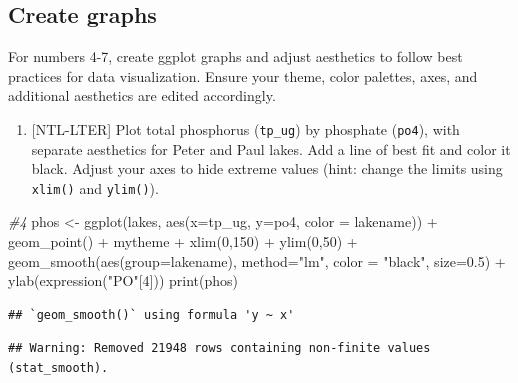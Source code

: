 \documentclass[
]{article}
\newenvironment{Shaded}{\begin{snugshade}}{\end{snugshade}}
\newcommand{\AttributeTok}[1]{\textcolor[rgb]{0.77,0.63,0.00}{#1}}
\newcommand{\CommentTok}[1]{\textcolor[rgb]{0.56,0.35,0.01}{\textit{#1}}}
\newcommand{\DecValTok}[1]{\textcolor[rgb]{0.00,0.00,0.81}{#1}}
\newcommand{\FloatTok}[1]{\textcolor[rgb]{0.00,0.00,0.81}{#1}}
\newcommand{\FunctionTok}[1]{\textcolor[rgb]{0.00,0.00,0.00}{#1}}
\newcommand{\NormalTok}[1]{#1}
\newcommand{\OtherTok}[1]{\textcolor[rgb]{0.56,0.35,0.01}{#1}}
\newcommand{\SpecialCharTok}[1]{\textcolor[rgb]{0.00,0.00,0.00}{#1}}
\newcommand{\StringTok}[1]{\textcolor[rgb]{0.31,0.60,0.02}{#1}}
\providecommand{\tightlist}{%
  \setlength{\itemsep}{0pt}\setlength{\parskip}{0pt}}
\begin{document}
\hypertarget{create-graphs}{%
\subsection{Create graphs}\label{create-graphs}}

For numbers 4-7, create ggplot graphs and adjust aesthetics to follow
best practices for data visualization. Ensure your theme, color
palettes, axes, and additional aesthetics are edited accordingly.

\begin{enumerate}
\def\labelenumi{\arabic{enumi}.}
\setcounter{enumi}{3}
\tightlist
\item
  {[}NTL-LTER{]} Plot total phosphorus (\texttt{tp\_ug}) by phosphate
  (\texttt{po4}), with separate aesthetics for Peter and Paul lakes. Add
  a line of best fit and color it black. Adjust your axes to hide
  extreme values (hint: change the limits using \texttt{xlim()} and
  \texttt{ylim()}).
\end{enumerate}

\begin{Shaded}
\begin{Highlighting}[]
\CommentTok{\#4}
\NormalTok{phos }\OtherTok{\textless{}{-}} \FunctionTok{ggplot}\NormalTok{(lakes, }\FunctionTok{aes}\NormalTok{(}\AttributeTok{x=}\NormalTok{tp\_ug, }\AttributeTok{y=}\NormalTok{po4, }\AttributeTok{color =}\NormalTok{ lakename)) }\SpecialCharTok{+} 
  \FunctionTok{geom\_point}\NormalTok{() }\SpecialCharTok{+}
\NormalTok{  mytheme }\SpecialCharTok{+}
  \FunctionTok{xlim}\NormalTok{(}\DecValTok{0}\NormalTok{,}\DecValTok{150}\NormalTok{) }\SpecialCharTok{+} 
  \FunctionTok{ylim}\NormalTok{(}\DecValTok{0}\NormalTok{,}\DecValTok{50}\NormalTok{) }\SpecialCharTok{+}
  \FunctionTok{geom\_smooth}\NormalTok{(}\FunctionTok{aes}\NormalTok{(}\AttributeTok{group=}\NormalTok{lakename), }\AttributeTok{method=}\StringTok{"lm"}\NormalTok{, }\AttributeTok{color =} \StringTok{"black"}\NormalTok{, }\AttributeTok{size=}\FloatTok{0.5}\NormalTok{) }\SpecialCharTok{+}
  \FunctionTok{ylab}\NormalTok{(}\FunctionTok{expression}\NormalTok{(}\StringTok{"PO"}\NormalTok{[}\DecValTok{4}\NormalTok{]))}
\FunctionTok{print}\NormalTok{(phos)}
\end{Highlighting}
\end{Shaded}

\begin{verbatim}
## `geom_smooth()` using formula 'y ~ x'
\end{verbatim}

\begin{verbatim}
## Warning: Removed 21948 rows containing non-finite values (stat_smooth).
\end{verbatim}
\end{document}

